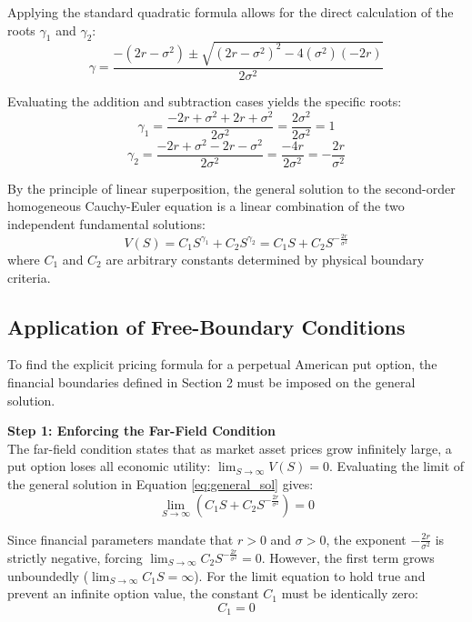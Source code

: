 \documentclass[12pt]{article}
\theoremstyle{definition}
\numberwithin{equation}{section}
\begin{document}
Applying the standard quadratic formula allows for the direct calculation of the roots $\gamma_1$ and $\gamma_2$:
\begin{equation}
\gamma = \frac{-(2r - \sigma^2) \pm \sqrt{(2r - \sigma^2)^2 - 4(\sigma^2)(-2r)}}{2\sigma^2}
\end{equation}


Evaluating the addition and subtraction cases yields the specific roots:
\begin{equation}\label{eq:root1}
\gamma_1 = \frac{-2r + \sigma^2 + 2r + \sigma^2}{2\sigma^2} = \frac{2\sigma^2}{2\sigma^2} = 1
\end{equation}
\begin{equation}\label{eq:root2}
\gamma_2 = \frac{-2r + \sigma^2 - 2r - \sigma^2}{2\sigma^2} = \frac{-4r}{2\sigma^2} = -\frac{2r}{\sigma^2}
\end{equation}

By the principle of linear superposition, the general solution to the second-order homogeneous Cauchy-Euler equation is a linear combination of the two independent fundamental solutions:
\begin{equation}\label{eq:general_sol}
V(S) = C_1 S^{\gamma_1} + C_2 S^{\gamma_2} = C_1 S + C_2 S^{-\frac{2r}{\sigma^2}}
\end{equation}
where $C_1$ and $C_2$ are arbitrary constants determined by physical boundary criteria.

\subsection{Application of Free-Boundary Conditions}
To find the explicit pricing formula for a perpetual American put option, the financial boundaries defined in Section 2 must be imposed on the general solution.

\textbf{Step 1: Enforcing the Far-Field Condition} \\
The far-field condition states that as market asset prices grow infinitely large, a put option loses all economic utility: $\lim_{S \to \infty} V(S) = 0$. Evaluating the limit of the general solution in Equation \eqref{eq:general_sol} gives:
\begin{equation}
\lim_{S \to \infty} \left( C_1 S + C_2 S^{-\frac{2r}{\sigma^2}} \right) = 0
\end{equation}

Since financial parameters mandate that $r > 0$ and $\sigma > 0$, the exponent $-\frac{2r}{\sigma^2}$ is strictly negative, forcing $\lim_{S \to \infty} C_2 S^{-\frac{2r}{\sigma^2}} = 0$. However, the first term grows unboundedly ($\lim_{S \to \infty} C_1 S = \infty$). For the limit equation to hold true and prevent an infinite option value, the constant $C_1$ must be identically zero:
\begin{equation}\label{eq:c1_zero}
C_1 = 0
\end{equation}
\end{document}
